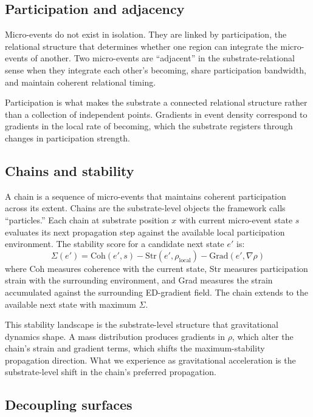\documentclass[11pt,a4paper]{article}
\begin{document}
\subsection{Participation and adjacency}

Micro-events do not exist in isolation. They are linked by participation, the relational structure that determines whether one region can integrate the micro-events of another. Two micro-events are ``adjacent'' in the substrate-relational sense when they integrate each other's becoming, share participation bandwidth, and maintain coherent relational timing.

Participation is what makes the substrate a connected relational structure rather than a collection of independent points. Gradients in event density correspond to gradients in the local rate of becoming, which the substrate registers through changes in participation strength.

\subsection{Chains and stability}

A chain is a sequence of micro-events that maintains coherent participation across its extent. Chains are the substrate-level objects the framework calls ``particles.'' Each chain at substrate position $x$ with current micro-event state $s$ evaluates its next propagation step against the available local participation environment. The stability score for a candidate next state $e'$ is:
\[
\Sigma(e') = \mathrm{Coh}(e', s) - \mathrm{Str}(e', \rho_{\mathrm{local}}) - \mathrm{Grad}(e', \nabla\rho)
\]
where Coh measures coherence with the current state, Str measures participation strain with the surrounding environment, and Grad measures the strain accumulated against the surrounding ED-gradient field. The chain extends to the available next state with maximum $\Sigma$.

This stability landscape is the substrate-level structure that gravitational dynamics shape. A mass distribution produces gradients in $\rho$, which alter the chain's strain and gradient terms, which shifts the maximum-stability propagation direction. What we experience as gravitational acceleration is the substrate-level shift in the chain's preferred propagation.

\subsection{Decoupling surfaces}
\end{document}
